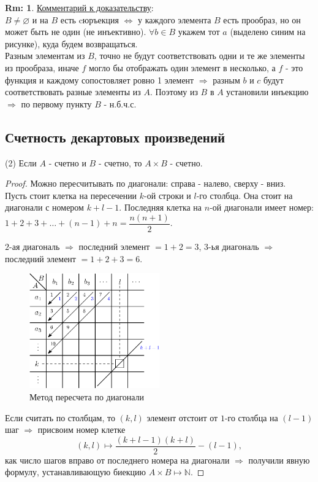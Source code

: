 \documentclass[12pt]{article}
\theoremstyle{definition}
\newtheorem{rem}{Rm:}
\begin{document}
\begin{rem}
\uline{Комментарий к доказательству}:\\
$B \neq \varnothing$ и на $B$ есть cюръекция $\Leftrightarrow$ у каждого элемента $B$ есть прообраз, но он может быть не один (не инъективно). $\forall b \in B$ укажем тот $a$ (выделено синим на рисунке), куда будем возвращаться.\\ 
Разным элементам из $B$, точно не будут соответствовать одни и те же элементы из прообраза, иначе $f$ могло бы отображать один элемент в несколько, а $f$ - это функция и каждому сопостовляет ровно 1 элемент $\Rightarrow$ разным $b$ и $c$ будут соответствовать разные элементы из $A$. 
Поэтому из $B$ в $A$ установили инъекцию $\Rightarrow$ по первому пункту $B$ - н.б.ч.с.
\end{rem}

\newpage
\subsection*{Счетность декартовых произведений}

(2) Если $A$ - счетно и $B$ - счетно, то $A\times B$ - счетно.
\begin{proof}
Можно пересчитывать по диагонали: справа - налево, сверху - вниз.\\
Пусть стоит клетка на пересечении $k$-ой строки и $l$-го столбца. Она стоит на диагонали с номером $k+l-1$.
Последняя клетка на $n$-ой диагонали имеет номер: $1 + 2 + 3 + \dotsc + (n-1) + n = \dfrac{n(n+1)}{2}$. 

$2$-ая диагональ $\Rightarrow$ последний элемент $= 1 + 2 = 3$, $3$-ья диагональ $\Rightarrow$ последний элемент $= 1 + 2 + 3 = 6$.

	\begin{figure}[H]
		\centering
		\includegraphics[width=0.5\textwidth]{5_2.eps}
		\caption{Метод пересчета по диагонали}
		\label{5_2}
	\end{figure}

Если считать по столбцам, то $(k, l)$ элемент отстоит от $1$-го столбца на $(l-1)$ шаг $\Rightarrow$ присвоим номер клетке
$$(k,l) \mapsto \dfrac{(k+l-1)(k+l)}{2} - (l-1),$$
как число шагов вправо от последнего номера на диагонали $\Rightarrow$ получили явную формулу, устанавливающую биекцию $A\times B \mapsto \mathbb{N}$.
\end{proof}
\end{document}
